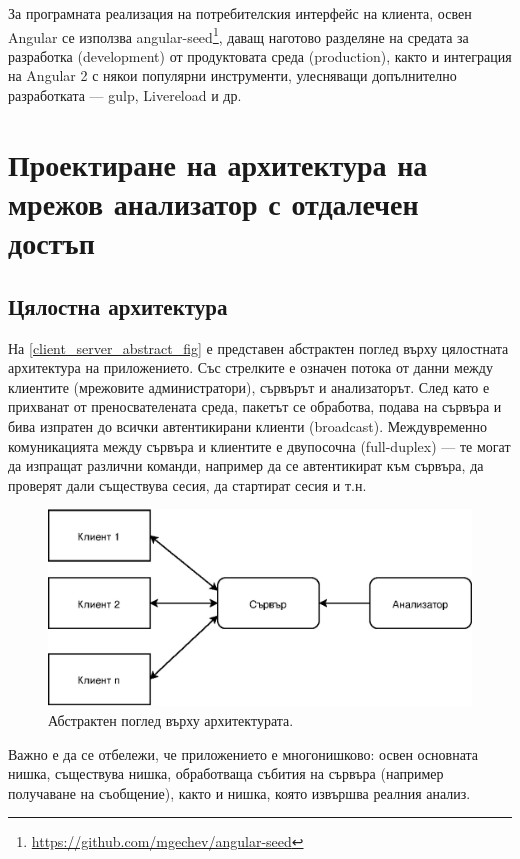 \documentclass[12pt,a4paper,oneside]{book}
\begin{document}
За програмната реализация на потребителския интерфейс на клиента, освен Angular
се използва angular-seed\footnote{\url{https://github.com/mgechev/angular-seed}},
даващ наготово разделяне на средата за разработка (development) от
продуктовата среда (production), както и интеграция на Angular 2 с някои
популярни инструменти, улесняващи допълнително разработката --- gulp,
Livereload и др.

\section{Проектиране на архитектура на мрежов анализатор с отдалечен достъп}

\subsection{Цялостна архитектура}

На \autoref{client_server_abstract_fig} е представен абстрактен поглед върху
цялостната архитектура на приложението. Със стрелките е означен потока от
данни между клиентите (мрежовите администратори), сървърът и анализаторът. След
като е прихванат от преносвателената среда, пакетът се обработва, подава на
сървъра и бива изпратен до всички автентикирани клиенти (broadcast).
Междувременно комуникацията между сървъра и клиентите е двупосочна (full-duplex)
--- те могат да изпращат различни команди, например да се автентикират към сървъра,
да проверят дали съществува сесия, да стартират сесия и т.н.

\begin{figure}[h!]
  \centering
  \includegraphics[scale=.7]{figures/client_server_abstract.eps}
  \caption{Абстрактен поглед върху архитектурата.}
  \label{client_server_abstract_fig}
\end{figure}

Важно е да се отбележи, че приложението е многонишково: освен основната нишка,
съществува нишка, обработваща събития на сървъра (например получаване на
съобщение), както и нишка, която извършва реалния анализ.
\end{document}
